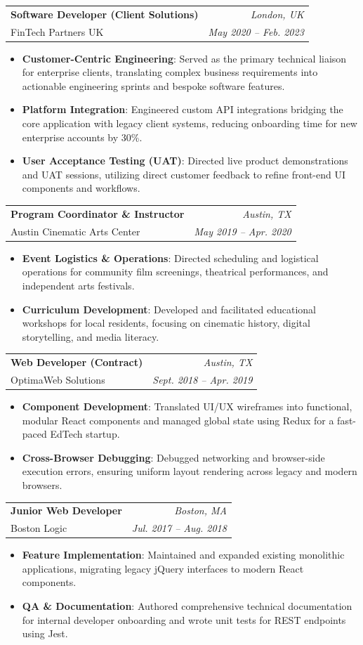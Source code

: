 \documentclass[letterpaper,10.5pt]{extarticle}
\makeatletter
\newcommand{\resumeItem}[1]{
  \item\small{
    {\color{graytext}#1 \vspace{-2pt}}
  }
}
\newcommand{\resumeSubheading}[4]{
  \vspace{5pt}\item %
    \begin{tabular*}{1.0\textwidth}[t]{l@{\extracolsep{\fill}}r}
      \textbf{\large\color{darktext}#1} & \textit{\small\color{Minty}#4} \\
      {\small\color{graytext}#3} & \textit{\small\color{graytext}#2} \\
    \end{tabular*}\vspace{-1pt}
}
\newcommand{\resumeItemListStart}{\begin{itemize}}
\newcommand{\resumeItemListEnd}{\end{itemize}\vspace{-5pt}}
\makeatother
\begin{document}
    \resumeSubheading
      {Software Developer (Client Solutions)}{May 2020 -- Feb. 2023}
      {FinTech Partners UK}{\textcolor{Minty}London, UK}
      \resumeItemListStart
        \resumeItem{\textbf{\color{darktext}Customer-Centric Engineering}: Served as the primary technical liaison for enterprise clients, translating complex business requirements into actionable engineering sprints and bespoke software features.}
        \resumeItem{\textbf{\color{darktext}Platform Integration}: Engineered custom API integrations bridging the core application with legacy client systems, reducing onboarding time for new enterprise accounts by 30\%.}
        \resumeItem{\textbf{\color{darktext}User Acceptance Testing (UAT)}: Directed live product demonstrations and UAT sessions, utilizing direct customer feedback to refine front-end UI components and workflows.}
    \resumeItemListEnd

    \resumeSubheading
      {Program Coordinator \& Instructor}{May 2019 -- Apr. 2020}
      {Austin Cinematic Arts Center}{\textcolor{Minty}Austin, TX}
      \resumeItemListStart
        \resumeItem{\textbf{\color{darktext}Event Logistics \& Operations}: Directed scheduling and logistical operations for community film screenings, theatrical performances, and independent arts festivals.}
        \resumeItem{\textbf{\color{darktext}Curriculum Development}: Developed and facilitated educational workshops for local residents, focusing on cinematic history, digital storytelling, and media literacy.}
    \resumeItemListEnd
    
     \resumeSubheading
      {Web Developer (Contract)}{Sept. 2018 -- Apr. 2019}
      {OptimaWeb Solutions}{\textcolor{Minty}Austin, TX}
      \resumeItemListStart
        \resumeItem{\textbf{\color{darktext}Component Development}: Translated UI/UX wireframes into functional, modular React components and managed global state using Redux for a fast-paced EdTech startup.}
        \resumeItem{\textbf{\color{darktext}Cross-Browser Debugging}: Debugged networking and browser-side execution errors, ensuring uniform layout rendering across legacy and modern browsers.}
    \resumeItemListEnd

     \resumeSubheading
      {Junior Web Developer}{Jul. 2017 -- Aug. 2018}
      {Boston Logic}{\textcolor{Minty}Boston, MA}
      \resumeItemListStart
        \resumeItem{\textbf{\color{darktext}Feature Implementation}: Maintained and expanded existing monolithic applications, migrating legacy jQuery interfaces to modern React components.}
        \resumeItem{\textbf{\color{darktext}QA \& Documentation}: Authored comprehensive technical documentation for internal developer onboarding and wrote unit tests for REST endpoints using Jest.}
    \resumeItemListEnd
\end{document}
